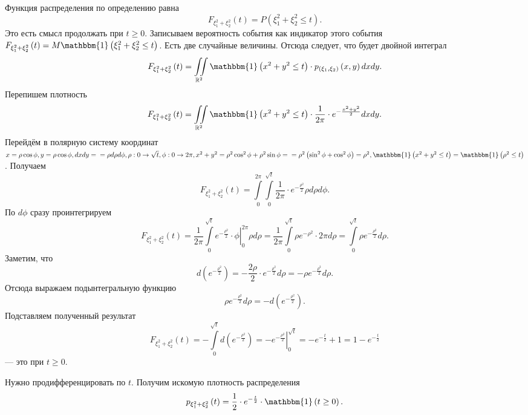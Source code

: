 Функция распределения по определению равна
$$F_{ \xi_1^2 + \xi_2^2} \left( t \right) =
P \left( \xi_1^2 + \xi_2^2 \leq t \right).$$
Это есть смысл продолжать при $t \geq 0$.
Записываем вероятность события как индикатор этого события $F_{ \xi_1^2 + \xi_2^2} \left( t \right) = M \mathbbm{1} \left( \xi_1^2 + \xi_2^2 \leq t \right) $.
Есть две случайные величины.
Отсюда следует, что будет двойной интеграл
$$F_{ \xi_1^2 + \xi_2^2} \left( t \right) =
\iint \limits_{ \mathbb{R}^2} \mathbbm{1} \left( x^2 + y^2 \leq t \right) \cdot p_{ \left( \xi_1, \xi_2 \right) } \left( x, y \right) dxdy.$$
Перепишем плотность
$$F_{ \xi_1^2 + \xi_2^2} \left( t \right) =
\iint \limits_{ \mathbb{R}^2} \mathbbm{1} \left( x^2 + y^2 \leq t \right) \cdot \frac{1}{2 \pi } \cdot e^{- \frac{x^2 + y^2}{2}} dxdy.$$
Перейдём в полярную систему координат
$x = \rho \cos \phi,
y = \rho \cos \phi,
dxdy = \\
= \rho d \rho d \phi,
\rho: 0 \rightarrow \sqrt{t},
\phi: 0 \rightarrow 2 \pi,
x^2 + y^2 = \rho^2 \cos^2 \phi + \rho^2 \sin \phi = \\
= \rho^2 \left( \sin^2 \phi + \cos^2 \phi \right) = \rho^2,
\mathbbm{1} \left( x^2 + y^2 \leq t \right) = \mathbbm{1} \left( \rho^2 \leq t \right) $.
Получаем
$$F_{ \xi_1^2 + \xi_2^2} \left( t \right) =
\int \limits_0^{2 \pi } \int \limits_0^{ \sqrt{t}} \frac{1}{2 \pi } \cdot e^{- \frac{ \rho^2}{2}} \rho d \rho d \phi.$$
По $d \phi $ сразу проинтегрируем
$$F_{ \xi_1^2 + \xi_2^2} \left( t \right) =
\frac{1}{2 \pi } \int \limits_0^{ \sqrt{t}} \left. e^{- \frac{ \rho^2}{2}} \cdot \phi \right|_0^{2 \pi } \rho d \rho =
\frac{1}{2 \pi } \int \limits_0^{ \sqrt{t}} \rho e^{- \rho^2} \cdot 2 \pi d \rho =
\int \limits_0^{ \sqrt{t}} \rho e^{- \frac{ \rho^2}{2}} d \rho.$$
Заметим, что
$$d \left( e^{- \frac{ \rho^2}{2}} \right) =
- \frac{2 \rho }{2} \cdot e^{- \frac{ \rho^2}{2}} d \rho =
- \rho e^{- \frac{ \rho^2}{2}} d \rho.$$
Отсюда выражаем подынтегральную функцию
$$ \rho e^{- \frac{ \rho^2}{2}} d \rho =
-d \left( e^{- \frac{ \rho^2}{2}} \right) .$$
Подставляем полученный результат
$$F_{ \xi_1^2 + \xi_2^2} \left( t \right) =
- \int \limits_0^{ \sqrt{t}} d \left( e^{- \frac{ \rho^2}{2}} \right) =
\left. - e^{- \frac{ \rho^2}{2}} \right|_0^{ \sqrt{t}} =
-e^{- \frac{t}{2}} + 1 =
1 - e^{- \frac{t}{2}}$$
--- это при $t \geq 0$.

Нужно продифференцировать по $t$.
Получим искомую плотность распределения
$$p_{ \xi_1^2 + \xi_2^2} \left( t \right) =
\frac{1}{2} \cdot e^{- \frac{t}{2}} \cdot \mathbbm{1} \left( t \geq 0 \right).$$

